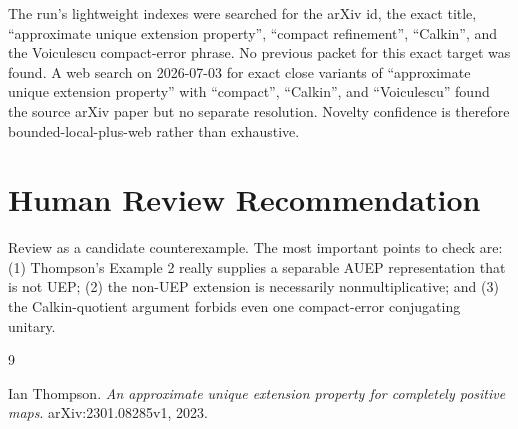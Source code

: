 \documentclass[11pt]{article}
\begin{document}
The run's lightweight indexes were searched for the arXiv id, the exact title,
``approximate unique extension property'', ``compact refinement'', ``Calkin'',
and the Voiculescu compact-error phrase.  No previous packet for this exact
target was found.  A web search on 2026-07-03 for exact close variants of
``approximate unique extension property'' with ``compact'', ``Calkin'', and
``Voiculescu'' found the source arXiv paper but no separate resolution.
Novelty confidence is therefore bounded-local-plus-web rather than exhaustive.

\section{Human Review Recommendation}

Review as a candidate counterexample.  The most important points to check are:
(1) Thompson's Example 2 really supplies a separable AUEP representation that is
not UEP; (2) the non-UEP extension is necessarily nonmultiplicative; and (3) the
Calkin-quotient argument forbids even one compact-error conjugating unitary.

\begin{thebibliography}{9}

Ian Thompson.
\newblock \emph{An approximate unique extension property for completely positive maps}.
\newblock arXiv:2301.08285v1, 2023.

\end{thebibliography}
\end{document}
